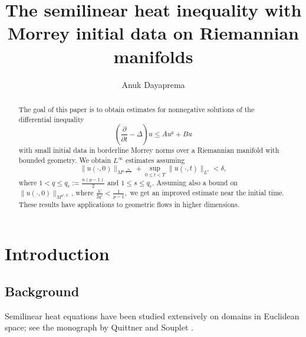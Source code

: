 \documentclass[12pt]{amsart}
\renewcommand{\1}{{\mathbf 1}}
\theoremstyle{others}
\numberwithin{equation}{section}
\begin{document}
\title[Semilinear heat inequality with %
Morrey initial data]{The semilinear heat inequality with Morrey initial data on %
Riemannian manifolds}
\author{Anuk Dayaprema}
\begin{abstract}
    The goal of this paper is to obtain estimates for nonnegative solutions of the differential inequality
\begin{equation}
        \left(\frac{\partial}{\partial t} - \Delta\right) u \leq A u^p + B u \nonumber
    \end{equation}
    with small initial data in borderline Morrey norms over a %
    Riemannian manifold with bounded geometry. %
    We obtain \(L^\infty\) estimates %
    assuming $$\|u(\cdot,0)\|_{M^{q, \frac{2q}{p-1}}} + \sup_{0 \leq t < T} \|u(\cdot, t) \|_{L^s} < \delta,$$
    where \(1 < q \leq q_c := \frac{n(p-1)}{2}\) and \(1 \leq s \leq q_c\). Assuming also a bound on $\|u(\cdot, 0)\|_{M^{q', \lambda'}}$, where $\frac{\lambda'}{2q'} < \frac{1}{p-1},$ %
    we get an improved estimate near the initial time. These results have applications to geometric flows in higher dimensions.
\end{abstract}
\maketitle

\vspace{-.5cm}
\section{Introduction} 
\subsection{Background}\label{subsection:background}

\thispagestyle{empty}

Semilinear heat equations have been studied extensively on domains in Euclidean space; see the monograph by Quittner and Souplet \cite[Chapter  
 II]{superlinearbook}.
 
\end{document}
